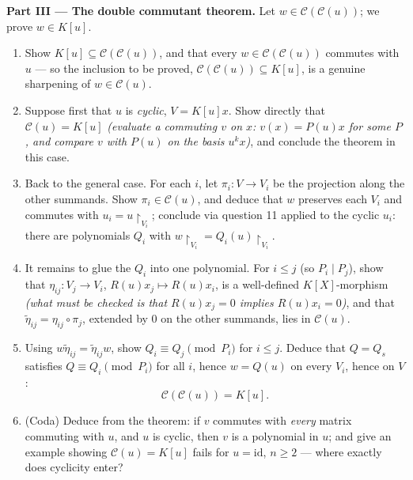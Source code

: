 \begin{problem}
\medskip
\noindent\textbf{Part III --- The double commutant theorem.}
Let $w \in \mathcal C(\mathcal C(u))$; we prove $w \in K[u]$.
\begin{enumerate}[resume]
  \item Show $K[u] \subseteq \mathcal C(\mathcal C(u))$, and that
        every $w \in \mathcal C(\mathcal C(u))$ commutes with $u$
        --- so the inclusion to be proved,
        $\mathcal C(\mathcal C(u)) \subseteq K[u]$, is a genuine
        sharpening of $w \in \mathcal C(u)$.
  \item Suppose first that $u$ is \emph{cyclic}, $V = K[u]x$.
        Show directly that $\mathcal C(u) = K[u]$
        \emph{(evaluate a commuting $v$ on $x$: $v(x) = P(u)x$
        for some $P$, and compare $v$ with $P(u)$ on the basis
        $u^k x$)}, and conclude the theorem in this case.
  \item Back to the general case. For each $i$, let $\pi_i\colon
        V \to V_i$ be the projection along the other summands.
        Show $\pi_i \in \mathcal C(u)$, and deduce that $w$
        preserves each $V_i$ and commutes with $u_i =
        u\restriction_{V_i}$; conclude via question 11 applied to
        the cyclic $u_i$: there are polynomials $Q_i$ with
        $w\restriction_{V_i} = Q_i(u)\restriction_{V_i}$.
  \item It remains to glue the $Q_i$ into one polynomial. For $i
        \leq j$ (so $P_i \mid P_j$), show that $\eta_{ij} \colon
        V_j \to V_i$, $R(u)x_j \mapsto R(u)x_i$, is a
        well-defined $K[X]$-morphism \emph{(what must be checked
        is that $R(u)x_j = 0$ implies $R(u)x_i = 0$)}, and that
        $\tilde\eta_{ij} = \eta_{ij}\circ\pi_j$, extended by $0$
        on the other summands, lies in $\mathcal C(u)$.
  \item Using $w\tilde\eta_{ij} = \tilde\eta_{ij}w$, show $Q_i
        \equiv Q_j \pmod{P_i}$ for $i \leq j$. Deduce that $Q =
        Q_s$
        satisfies $Q \equiv Q_i \pmod {P_i}$ for all $i$, hence
        $w = Q(u)$ on every $V_i$, hence on $V$:
        \[
        \boxed{\ \mathcal C(\mathcal C(u)) = K[u].\ }
        \]
  \item (Coda) Deduce from the theorem: if $v$ commutes with
        \emph{every} matrix commuting with $u$, and $u$ is
        cyclic, then $v$ is a polynomial in $u$; and give an
        example showing $\mathcal C(u) = K[u]$ fails for $u =
        \mathrm{id}$, $n \geq 2$ --- where exactly does
        cyclicity enter?
\end{enumerate}


\end{problem}
